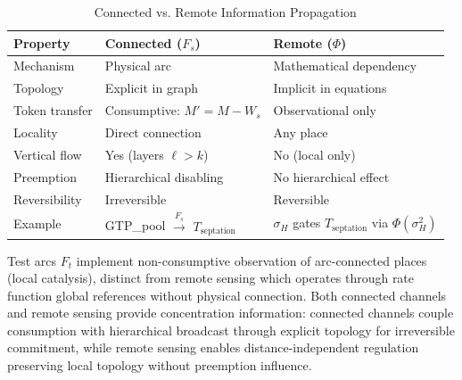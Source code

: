 \documentclass[10pt,letterpaper]{article}
\begin{document}
\begin{table}[h]
\centering
\footnotesize
\caption{Connected vs. Remote Information Propagation}
\label{tab:connected_remote}
\begin{tabular}{p{2.2cm}p{3.9cm}p{3.9cm}}
\toprule
\textbf{Property} & \textbf{Connected ($F_s$)} & \textbf{Remote ($\Phi$)} \\
\midrule
Mechanism & Physical arc & Mathematical dependency \\
Topology & Explicit in graph & Implicit in equations \\
Token transfer & Consumptive: $M' = M - W_s$ & Observational only \\
Locality & Direct connection & Any place \\
Vertical flow & Yes (layers $\ell > k$) & No (local only) \\
Preemption & Hierarchical disabling & No hierarchical effect \\
Reversibility & Irreversible & Reversible \\
Example & GTP\_pool $\xrightarrow{F_s}$ $T_{\text{septation}}$ & $\sigma_H$ gates $T_{\text{septation}}$ via $\Phi(\sigma_H^2)$ \\
\bottomrule
\end{tabular}
\end{table}

Test arcs $F_t$ implement non-consumptive observation of arc-connected places (local catalysis), distinct from remote sensing which operates through rate function global references without physical connection. Both connected channels and remote sensing provide concentration information: connected channels couple consumption with hierarchical broadcast through explicit topology for irreversible commitment, while remote sensing enables distance-independent regulation preserving local topology without preemption influence.
\end{document}
